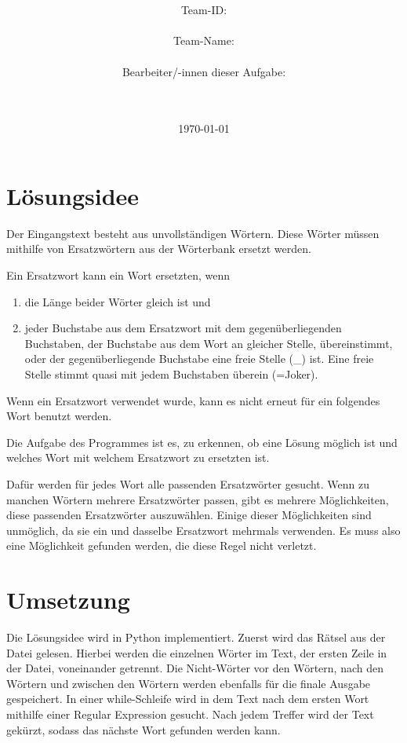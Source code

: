 \documentclass[a4paper,10pt,ngerman]{scrartcl}
\title{\textbf{\Huge\Aufgabe}}
\author{\LARGE Team-ID: \LARGE \TeamId \\\\
	    \LARGE Team-Name: \LARGE \TeamName \\\\
	    \LARGE Bearbeiter/-innen dieser Aufgabe: \\ 
	    \LARGE \Namen\\\\}
\date{\LARGE\today}
\begin{document}
\maketitle
\tableofcontents

\vspace{0.5cm}

\section{Lösungsidee}

Der Eingangstext besteht aus unvollständigen Wörtern.
Diese Wörter müssen mithilfe von Ersatzwörtern aus der Wörterbank ersetzt werden.

Ein Ersatzwort kann ein Wort ersetzten, wenn
\begin{enumerate}
    \item die Länge beider Wörter gleich ist und
    \item jeder Buchstabe aus dem Ersatzwort mit dem gegenüberliegenden Buchstaben, der Buchstabe aus dem Wort an gleicher Stelle, übereinstimmt, oder der gegenüberliegende Buchstabe eine freie Stelle (\glqq \_\grqq{}) ist.
    Eine freie Stelle stimmt quasi mit jedem Buchstaben überein (=Joker).
\end{enumerate}
Wenn ein Ersatzwort verwendet wurde, kann es nicht erneut für ein folgendes Wort benutzt werden.

Die Aufgabe des Programmes ist es, zu erkennen, ob eine Lösung möglich ist und welches Wort mit welchem Ersatzwort zu ersetzten ist.

Dafür werden für jedes Wort alle passenden Ersatzwörter gesucht.
Wenn zu manchen Wörtern mehrere Ersatzwörter passen, gibt es mehrere Möglichkeiten, diese passenden Ersatzwörter auszuwählen.
Einige dieser Möglichkeiten sind unmöglich, da sie ein und dasselbe Ersatzwort mehrmals verwenden.
Es muss also eine Möglichkeit gefunden werden, die diese Regel nicht verletzt.

\section{Umsetzung}

Die Lösungsidee wird in Python implementiert.
Zuerst wird das Rätsel aus der Datei gelesen.
Hierbei werden die einzelnen Wörter im Text, der ersten Zeile in der Datei, voneinander getrennt.
Die Nicht-Wörter vor den Wörtern, nach den Wörtern und zwischen den Wörtern werden ebenfalls für die finale Ausgabe gespeichert. 
In einer while-Schleife wird in dem Text nach dem ersten Wort mithilfe einer Regular Expression gesucht.
Nach jedem Treffer wird der Text gekürzt, sodass das nächste Wort gefunden werden kann.
\end{document}
